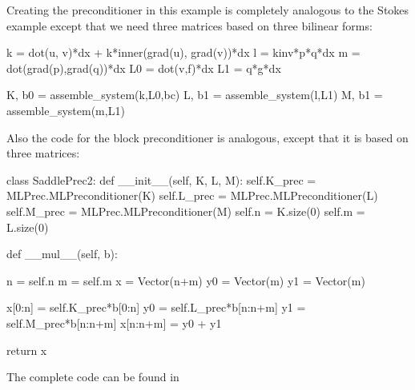Creating the preconditioner in this example is completely analogous to the Stokes
example except that we need three matrices based on three bilinear forms: 
\begin{python}
k = dot(u, v)*dx +  k*inner(grad(u), grad(v))*dx 
l = kinv*p*q*dx 
m = dot(grad(p),grad(q))*dx 
L0 = dot(v,f)*dx 
L1 = q*g*dx 

K, b0 = assemble_system(k,L0,bc)
L, b1 = assemble_system(l,L1)
M, b1 = assemble_system(m,L1)
\end{python}
Also the code for the block preconditioner is analogous, except that
it is based on three matrices: 
\begin{python}
class SaddlePrec2: 
    def __init__(self, K, L, M):  
        self.K_prec = MLPrec.MLPreconditioner(K)
        self.L_prec = MLPrec.MLPreconditioner(L)
        self.M_prec = MLPrec.MLPreconditioner(M)
        self.n = K.size(0)
        self.m = L.size(0)

    def __mul__(self, b):

        n = self.n
        m = self.m
        x = Vector(n+m)
        y0 = Vector(m)
        y1 = Vector(m)

        x[0:n]    = self.K_prec*b[0:n]
        y0        = self.L_prec*b[n:n+m] 
        y1        = self.M_prec*b[n:n+m] 
        x[n:n+m]   = y0 + y1  

        return x 
\end{python}
The complete code can be found in 

